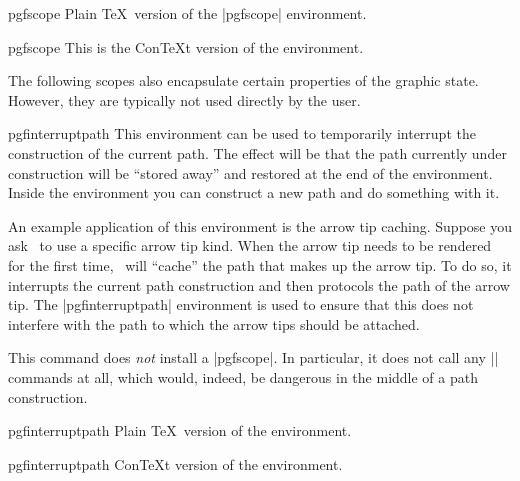 \begin{plainenvironment}{{pgfscope}}
  Plain \TeX\ version of the |{pgfscope}| environment.
\end{plainenvironment}

\begin{contextenvironment}{{pgfscope}}
  This is the Con\TeX t version of the environment.
\end{contextenvironment}


The following scopes also encapsulate certain properties of the
graphic state. However, they are typically not used directly by the
user.

\begin{environment}{{pgfinterruptpath}}
  This environment can be used to temporarily interrupt the
  construction of the current path. The effect will be that the path
  currently under construction will be ``stored away'' and restored at
  the end of the environment. Inside the environment you can construct
  a new path and do something with it.

  An example application of this environment is the arrow tip
  caching. Suppose you ask \pgfname\ to use a specific arrow tip
  kind. When the arrow tip needs to be rendered for the first time,
  \pgfname\ will ``cache'' the path that makes up the arrow tip. To do
  so, it interrupts the current path construction and then protocols
  the path of the arrow tip. The |{pgfinterruptpath}| environment is
  used to ensure that this does not interfere with the path to which
  the arrow tips should be attached.

  This command does \emph{not} install a |{pgfscope}|. In particular,
  it does not call any |\pgfsys@| commands at all, which would,
  indeed, be dangerous in the middle of a path construction.
\end{environment}

\begin{plainenvironment}{{pgfinterruptpath}}
  Plain \TeX\ version of the environment.
\end{plainenvironment}

\begin{contextenvironment}{{pgfinterruptpath}}
  Con\TeX t version of the environment.
\end{contextenvironment}


